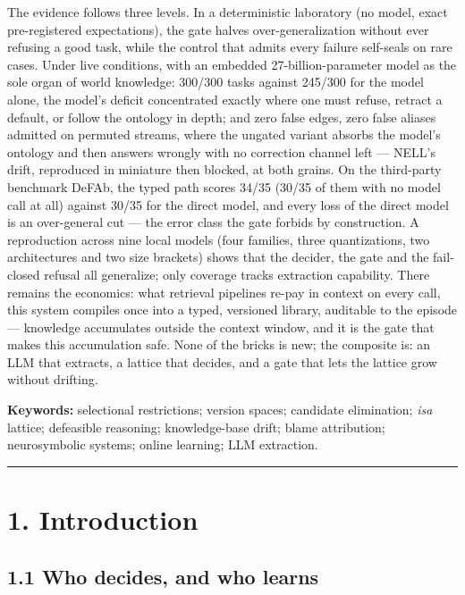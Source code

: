 \documentclass[11pt]{article}
\begin{document}
The evidence follows three levels. In a deterministic laboratory (no model, exact pre-registered expectations), the gate halves over-generalization without ever refusing a good task, while the control that admits every failure self-seals on rare cases. Under live conditions, with an embedded 27-billion-parameter model as the sole organ of world knowledge: 300/300 tasks against 245/300 for the model alone, the model's deficit concentrated exactly where one must refuse, retract a default, or follow the ontology in depth; and zero false edges, zero false aliases admitted on permuted streams, where the ungated variant absorbs the model's ontology and then answers wrongly with no correction channel left — NELL's drift, reproduced in miniature then blocked, at both grains. On the third-party benchmark DeFAb, the typed path scores 34/35 (30/35 of them with no model call at all) against 30/35 for the direct model, and every loss of the direct model is an over-general cut — the error class the gate forbids by construction. A reproduction across nine local models (four families, three quantizations, two architectures and two size brackets) shows that the decider, the gate and the fail-closed refusal all generalize; only coverage tracks extraction capability. There remains the economics: what retrieval pipelines re-pay in context on every call, this system compiles once into a typed, versioned library, auditable to the episode — knowledge accumulates outside the context window, and it is the gate that makes this accumulation safe. None of the bricks is new; the composite is: an LLM that extracts, a lattice that decides, and a gate that lets the lattice grow without drifting.

\textbf{Keywords:} selectional restrictions; version spaces; candidate elimination; \emph{isa} lattice; defeasible reasoning; knowledge-base drift; blame attribution; neurosymbolic systems; online learning; LLM extraction.

\medskip\hrule\medskip

\section*{1. Introduction}

\subsection*{1.1 Who decides, and who learns}
\end{document}
